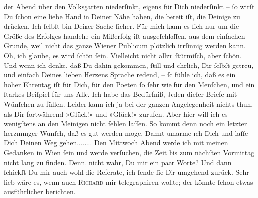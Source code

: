 \begin{ledgroupsized}[t]{13cm}
               der Abend über den {\pb}\strikeout{\textcolor{gray}{×}\-\textcolor{gray}{×}\-\textcolor{gray}{×}\-\textcolor{gray}{×}\-\textcolor{gray}{×}\-\textcolor{gray}{×}\-\textcolor{gray}{×}}{ }Volksgarten niederſinkt, eigens für Dich
               niederſinkt – ſo wirſt Du ſchon eine liebe Hand in Deiner Nähe haben, die bereit iſt,
               die Deinige zu drücken. Ich ſelbſt bin Deiner Sache ſicher.  Für mich kann es ſich nur um die Größe des Erfolges handeln; ein Mißerfolg iſt
               ausgeſchloſſen,  aus dem einfachen Grunde, weil
               nicht das ganze Wiener Publicum plötzlich
               irrſinnig werden kann. Oh, ich glaube, es wird ſchön ſein. Vielleicht nicht allzu
               ſtürmiſch, aber ſchön. Und wenn ich denke, {\pb}daß Du
               dahin gekommen, ſtill und ehrlich, Dir  ſelbſt
               getreu, und einfach Deines lieben Herzens Sprache redend, – ſo fühle ich, daß es ein
               hoher Ehrentag iſt für Dich, für den Poeten ſo ſehr
               wie für den Menſchen, und ein ſtarkes Beiſpiel für uns Alle. Ich habe das Bedürfniß,
               Jeden dieſer Briefe mit Wünſchen zu füllen. Leider kann ich ja bei der ganzen
               Angelegenheit nichts thun, als Dir fortwährend »Glück!« und »Glück!« zurufen. Aber
               hier will ich es wenigſtens an den Meinigen nicht {\pb}fehlen laſſen. So kommt denn noch ein letzter herzinniger Wunſch, daß es gut werden
               möge. Damit umarme ich Dich und laſſe Dich Deinen Weg gehen........\pend
           \pstart
           Den Mittwoch{ }Abend werde ich mit meinen Gedanken in Wien ſein und werde verſuchen, die Zeit bis zum nächſten
                  Vormittag nicht lang zu finden. Denn, nicht wahr, Du \label{K_L02750-2v}\label{K_L02750-2h} mir ein paar Worte? Und dann ſchickſt Du mir auch wohl die
               Referate, ich ſende {\pb}ſie Dir umgehend zurück. Sehr
               lieb wäre es, wenn auch \textsc{Richard} mir telegraphiren wollte; der könnte ſchon etwas ausführlicher berichten.\pend

\end{ledgroupsized}
